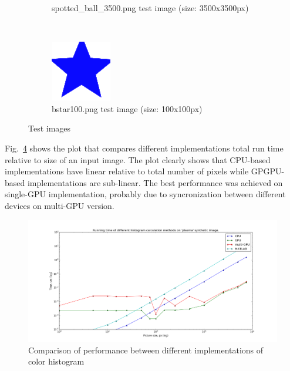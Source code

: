 \documentclass{article}
\begin{document}
\begin{figure}
\begin{subfigure}[b]{0.3\textwidth}
        \caption{spotted\_ball\_3500.png test image (size: 3500x3500px)}
        \label{fig:spotted_ball_3500}
\end{subfigure}
~
\begin{subfigure}[b]{0.3\textwidth}
        \includegraphics[width=\textwidth]{../data/bstar100.png}
        \caption{bstar100.png test image (size: 100x100px)}
        \label{fig:bstar100}
\end{subfigure}
\caption{Test images}
\label{fig:test_images}
\end{figure}

Fig.~\ref{fig:run_plot} shows the plot that compares different implementations total run time relative
to size of an input image. The plot clearly shows that CPU-based implementations
have linear relative to total number of pixels while GPGPU-based implementations are
sub-linear. The best performance was achieved on single-GPU implementation, probably
due to syncronization between different devices on multi-GPU version.

\begin{figure}
\centering
\includegraphics[width=\textwidth]{./figures/runtime_log_with_matlab.png}
\caption{Comparison of performance between different implementations of color histogram}
\label{fig:run_plot}
\end{figure}
\end{document}
